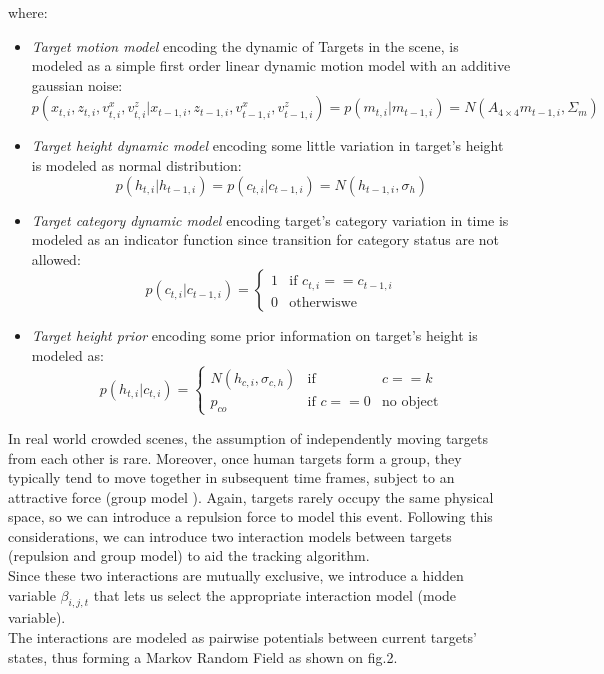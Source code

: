 where:
\begin{itemize}
\item \textit{Target motion model} encoding the dynamic of Targets in the scene, is modeled as a simple first order linear dynamic motion model with an additive gaussian noise:
$$
p(x_{t,i}, z_{t,i}, v_{t,i}^x,v_{t,i}^z | x_{t-1,i}, z_{t-1,i}, v_{t-1,i}^x,v_{t-1,i}^z)=
p(m_{t,i} | m_{t-1,i})=N(A_{4\times4} m_{t-1,i} , \Sigma_m )
$$
\item \textit{Target height dynamic model} encoding some little variation in target's height is modeled as normal distribution:
$$
p(h_{t,i} |h_{t-1,i}) =
 p(c_{t,i} |c_{t-1,i})= N(h_{t-1,i} , \sigma_h ) 
$$
\item \textit{Target category dynamic model} encoding  target's category variation in time is modeled as an indicator function since transition for category status are not allowed:
$$
 p(c_{t,i} |c_{t-1,i})= \left\{
\begin{array}{rl}
1 & \mbox{if }  c_{t,i}==c_{t-1,i} \\
0 & \mbox{otherwiswe } 
\end{array}
\right.
$$

\item \textit{Target height prior} encoding some prior information on target's height is  modeled as:
$$
 p(h_{t,i} |c_{t,i})= \left\{
\begin{array}{rcl}
 N(h_{c,i} , \sigma_{c,h} )  & \mbox{if } & c==k \\
 p_{co} & \mbox{if }  c==0  & \mbox{no object}
\end{array}
\right.
$$
\end{itemize}

In real world crowded scenes, the assumption of independently moving targets from each other is rare. Moreover, once human targets form a group, they typically tend to move together in subsequent time frames, subject to an attractive force (group model ). Again, targets rarely occupy the same physical space, so we can introduce a repulsion force to model this event. Following this considerations, we can introduce two interaction models between targets (repulsion and group model) to aid the tracking algorithm.\\
Since these two interactions are mutually exclusive, we introduce a hidden variable $\beta_{i,j,t}$ that lets us select the appropriate interaction model (mode
variable).\\
The interactions are modeled as pairwise potentials between current targets’ states, thus forming a Markov Random Field as shown on fig.2. 

